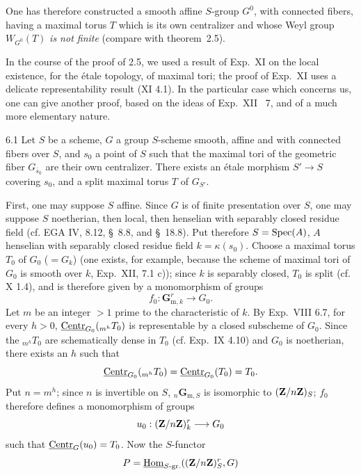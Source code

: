 One has therefore constructed a smooth affine $S$-group $G^0$, with connected fibers, having a maximal torus $T$ which is its own centralizer and whose Weyl group $W_{G^0}(T)$ \emph{is not finite} (compare with theorem~2.5).

\label{XIX.sec.6}
In the course of the proof of 2.5, we used a result of Exp.~XI on the local existence, for the \'etale topology, of maximal tori; the proof of Exp.~XI uses a delicate representability result (XI 4.1). In the particular case which concerns us, one can give another proof, based on the ideas of Exp.~XII \No~7, and of a much more elementary nature.

\begin{proposition}{6.1}\label{XIX.6.1}
Let $S$ be a scheme, $G$ a group $S$-scheme smooth, affine and with connected fibers over $S$, and $s_0$ a point of $S$ such that the maximal tori of the geometric fiber $G_{\overline{s}_0}$ are their own centralizer. There exists an \'etale morphism $S'\to S$ covering $s_0$, and a split maximal torus $T$ of $G_{S'}$.
\end{proposition}
First, one may suppose $S$ affine.{\renewcommand{\thefootnote}{(44)}} Since $G$ is of finite presentation over $S$, one may suppose $S$ noetherian, then local, then henselian with separably closed residue field (cf. EGA IV, 8.12, \S~8.8, and \S~18.8). Put therefore $S=\operatorname{Spec}(A)$, $A$ henselian with separably closed residue field $k=\kappa(s_0)$. Choose a maximal torus $T_0$ of $G_0$ ($=G_k$) (one exists, for example, because the scheme of maximal tori of $G_0$ is smooth over $k$, Exp.~XII, 7.1 c)); since $k$ is separably closed, $T_0$ is split (cf. X 1.4), and is therefore given by a monomorphism of groups
\[
f_0:\mathbf{G}_{\mathrm m,k}^r\to G_0.
\]
Let $m$ be an integer $>1$ prime to the characteristic of $k$. By Exp.~VIII 6.7, for every $h>0$, $\underline{\mathrm{Centr}}_{G_0}({}_{m^h}T_0)$ is representable by a closed subscheme of $G_0$. Since the ${}_{m^h}T_0$ are schematically dense in $T_0$ (cf. Exp.~IX 4.10) and $G_0$ is noetherian, there exists an $h$ such that
\[
\underline{\mathrm{Centr}}_{G_0}({}_{m^h}T_0)=\underline{\mathrm{Centr}}_{G_0}(T_0)=T_0.
\]
Put $n=m^h$; since $n$ is invertible on $S$, ${}_n\mathbf{G}_{\mathrm m,S}$ is isomorphic to $(\mathbf{Z}/n\mathbf{Z})_S$; $f_0$ therefore defines a monomorphism of groups
\[
u_0:(\mathbf{Z}/n\mathbf{Z})_k^r\longrightarrow G_0
\]
such that $\underline{\mathrm{Centr}}_G(u_0)=T_0$. Now the $S$-functor
\[
P=\underline{\operatorname{Hom}}_{S\text{-gr.}}((\mathbf{Z}/n\mathbf{Z})_S^r,G)
\]
